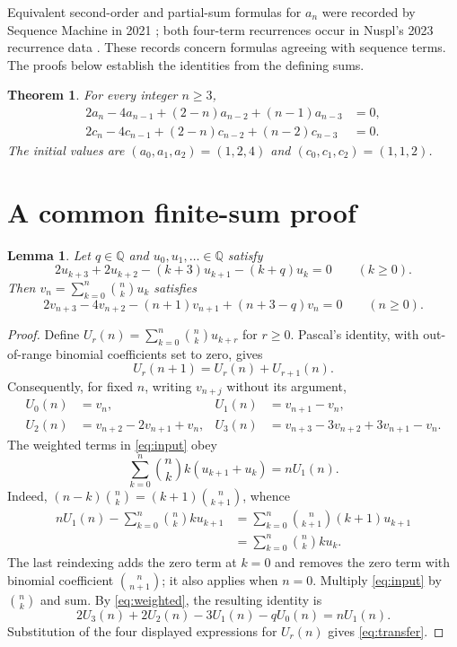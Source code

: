 \documentclass[11pt]{article}
\newtheorem{theorem}{Theorem}
\newtheorem{lemma}{Lemma}
\begin{document}
Equivalent second-order and partial-sum formulas for $a_n$ were recorded
by Sequence Machine in 2021 \cite{sequence-machine}; both four-term
recurrences occur in Nuspl's 2023 recurrence data \cite{nuspl}.
These records concern formulas agreeing with sequence terms.
The proofs below establish the identities from the defining sums.

\begin{theorem}\label{thm:recurrences}
For every integer $n\geq3$,
\begin{align}
 2a_n-4a_{n-1}+(2-n)a_{n-2}+(n-1)a_{n-3}&=0,
 \label{eq:a}\\
 2c_n-4c_{n-1}+(2-n)c_{n-2}+(n-2)c_{n-3}&=0.
 \label{eq:c}
\end{align}
The initial values are $(a_0,a_1,a_2)=(1,2,4)$ and
$(c_0,c_1,c_2)=(1,1,2)$.
\end{theorem}

\section{A common finite-sum proof}
\begin{lemma}\label{lem:transfer}
Let $q\in\mathbb Q$ and $u_0,u_1,\ldots\in\mathbb Q$ satisfy
\begin{equation}\label{eq:input}
 2u_{k+3}+2u_{k+2}-(k+3)u_{k+1}-(k+q)u_k=0
 \qquad(k\geq0).
\end{equation}
Then $v_n=\sum_{k=0}^{n}\binom nk u_k$ satisfies
\begin{equation}\label{eq:transfer}
 2v_{n+3}-4v_{n+2}-(n+1)v_{n+1}+(n+3-q)v_n=0
 \qquad(n\geq0).
\end{equation}
\end{lemma}
\begin{proof}
Define $U_r(n)=\sum_{k=0}^{n}\binom nk u_{k+r}$ for $r\geq0$.
Pascal's identity, with out-of-range binomial coefficients set to zero,
gives
\[
 U_r(n+1)=U_r(n)+U_{r+1}(n).
\]
Consequently, for fixed $n$, writing $v_{n+j}$ without its argument,
\begin{align*}
 U_0(n)&=v_n, & U_1(n)&=v_{n+1}-v_n,\\
 U_2(n)&=v_{n+2}-2v_{n+1}+v_n,&
 U_3(n)&=v_{n+3}-3v_{n+2}+3v_{n+1}-v_n.
\end{align*}
The weighted terms in \eqref{eq:input} obey
\begin{equation}\label{eq:weighted}
 \sum_{k=0}^{n}\binom nk k(u_{k+1}+u_k)=nU_1(n).
\end{equation}
Indeed, $(n-k)\binom nk=(k+1)\binom n{k+1}$, whence
\begin{align*}
 nU_1(n)-\sum_{k=0}^{n}\binom nk k u_{k+1}
 &=\sum_{k=0}^{n}\binom n{k+1}(k+1)u_{k+1}\\
 &=\sum_{k=0}^{n}\binom nk k u_k.
\end{align*}
The last reindexing adds the zero term at $k=0$ and removes the zero
term with binomial coefficient $\binom n{n+1}$; it also applies when
$n=0$. Multiply \eqref{eq:input} by $\binom nk$ and sum. By
\eqref{eq:weighted}, the resulting identity is
\[
 2U_3(n)+2U_2(n)-3U_1(n)-qU_0(n)=nU_1(n).
\]
Substitution of the four displayed expressions for $U_r(n)$ gives
\eqref{eq:transfer}.
\end{proof}
\end{document}

